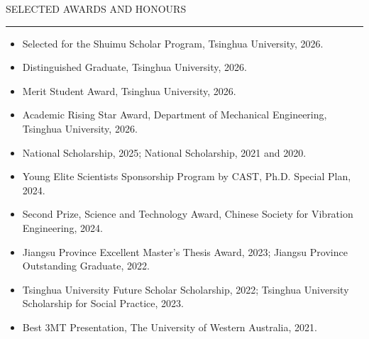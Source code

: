 \documentclass{resume}
\renewenvironment{rSection}[1]{
\sectionskip
\textcolor{TsinghuaPurple}{\MakeUppercase{#1}}
\sectionlineskip
\hrule
\begin{list}{}{\setlength{\leftmargin}{0em}}
\item[]
}{
\end{list}
}
\newcommand{\cvitem}[1]{\item #1}
\begin{document}
\begin{rSection}{Selected Awards and Honours}
\begin{itemize}[leftmargin=1.2em,itemsep=0.1em,topsep=0.15em]
\cvitem{Selected for the Shuimu Scholar Program, Tsinghua University, 2026.}
\cvitem{Distinguished Graduate, Tsinghua University, 2026.}
\cvitem{Merit Student Award, Tsinghua University, 2026.}
\cvitem{Academic Rising Star Award, Department of Mechanical Engineering, Tsinghua University, 2026.}
\cvitem{National Scholarship, 2025; National Scholarship, 2021 and 2020.}
\cvitem{Young Elite Scientists Sponsorship Program by CAST, Ph.D. Special Plan, 2024.}
\cvitem{Second Prize, Science and Technology Award, Chinese Society for Vibration Engineering, 2024.}
\cvitem{Jiangsu Province Excellent Master's Thesis Award, 2023; Jiangsu Province Outstanding Graduate, 2022.}
\cvitem{Tsinghua University Future Scholar Scholarship, 2022; Tsinghua University Scholarship for Social Practice, 2023.}
\cvitem{Best 3MT Presentation, The University of Western Australia, 2021.}
\end{itemize}
\end{rSection}
\end{document}
